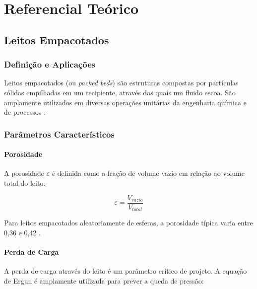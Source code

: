 \chapter{Referencial Teórico}
\label{cap:referencial}

\section{Leitos Empacotados}

\subsection{Definição e Aplicações}

Leitos empacotados (ou \textit{packed beds}) são estruturas compostas por partículas sólidas empilhadas em um recipiente, através das quais um fluido escoa. São amplamente utilizados em diversas operações unitárias da engenharia química e de processos \cite{ergun1952}.

\subsection{Parâmetros Característicos}

\subsubsection{Porosidade}

A porosidade $\varepsilon$ é definida como a fração de volume vazio em relação ao volume total do leito:

\begin{equation}
\varepsilon = \frac{V_{vazio}}{V_{total}}
\label{eq:porosidade}
\end{equation}

Para leitos empacotados aleatoriamente de esferas, a porosidade típica varia entre 0,36 e 0,42 \cite{dullien1992}.

\subsubsection{Perda de Carga}

A perda de carga através do leito é um parâmetro crítico de projeto. A equação de Ergun \cite{ergun1952} é amplamente utilizada para prever a queda de pressão:

